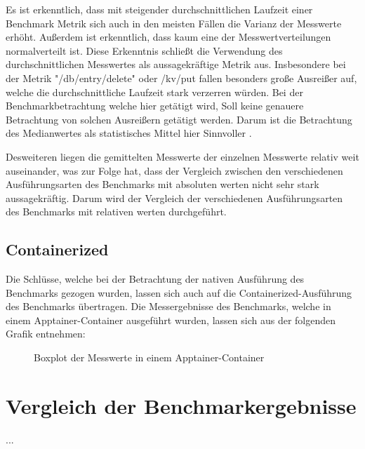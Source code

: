 \FloatBarrier

Es ist erkenntlich, dass mit steigender durchschnittlichen Laufzeit einer Benchmark Metrik sich auch in den meisten Fällen die Varianz der Messwerte erhöht. Außerdem ist erkenntlich, dass kaum eine der Messwertverteilungen normalverteilt ist. Diese Erkenntnis schließt die Verwendung des durchschnittlichen Messwertes als aussagekräftige Metrik aus. Insbesondere bei der Metrik "/db/entry/delete" oder /kv/put fallen besonders große Ausreißer auf, welche die durchschnittliche Laufzeit stark verzerren würden. Bei der Benchmarkbetrachtung welche hier getätigt wird, Soll keine genauere Betrachtung von solchen Ausreißern getätigt werden. Darum ist die Betrachtung des Medianwertes als statistisches Mittel hier Sinnvoller \cite[Vgl. 15f.]{stengelStatistikUndAufbereitung2011}. 

Desweiteren liegen die gemittelten Messwerte der einzelnen Messwerte relativ weit auseinander, was zur Folge hat, dass der Vergleich zwischen den verschiedenen Ausführungsarten des Benchmarks mit absoluten werten nicht sehr stark aussagekräftig. Darum wird der Vergleich der verschiedenen Ausführungsarten des Benchmarks mit relativen werten durchgeführt.

\subsection{Containerized}

Die Schlüsse, welche bei der Betrachtung der nativen Ausführung des Benchmarks gezogen wurden, lassen sich auch auf die Containerized-Ausführung des Benchmarks übertragen. Die Messergebnisse des Benchmarks, welche in einem Apptainer-Container ausgeführt wurden, lassen sich aus der folgenden Grafik entnehmen:

\begin{figure}[!h]
    \centering
    
    \caption{Boxplot der Messwerte in einem Apptainer-Container}
    \label{fig:boxplot_apptainer}
\end{figure}
\FloatBarrier

\section{Vergleich der Benchmarkergebnisse}

...


